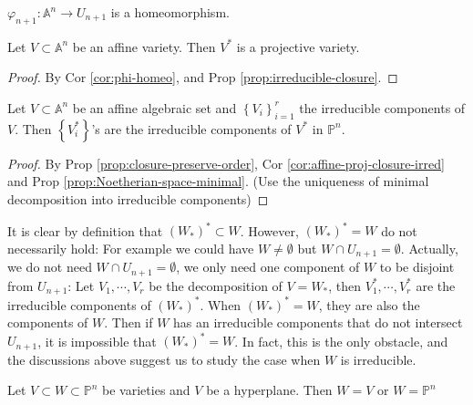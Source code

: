 \documentclass{note-eng}
\begin{document}
\begin{corollary}\label{cor:phi-homeo}
    $\varphi_{n + 1}: \mathbb{A}^n \rightarrow U_{n + 1}$ is a homeomorphism.
\end{corollary}

\begin{corollary}\label{cor:affine-proj-closure-irred}
    Let $V \subset \mathbb{A}^n$ be an affine variety. Then $V^\ast$ is a projective variety.
\end{corollary}

\begin{proof}
    By Cor \ref{cor:phi-homeo}, and Prop \ref{prop:irreducible-closure}.
\end{proof}

\begin{corollary}
    Let $V \subset \mathbb{A}^n$ be an affine algebraic set and $\left\lbrace V_i \right\rbrace_{i = 1}^r$ the irreducible components of $V$. Then $\left\lbrace V_i^\ast \right\rbrace$'s are the irreducible components of $V^\ast$ in $\mathbb{P}^n$.
\end{corollary}

\begin{proof}
    By Prop \ref{prop:closure-preserve-order}, Cor \ref{cor:affine-proj-closure-irred} and Prop \ref{prop:Noetherian-space-minimal}. (Use the uniqueness of minimal decomposition into irreducible components)
\end{proof}

It is clear by definition that $(W_\ast)^\ast \subset W$. However, $(W_\ast)^\ast = W$ do not necessarily hold: For example we could have $W \ne \emptyset$ but $W \cap U_{n + 1} = \emptyset$. Actually, we do not need $W \cap U_{n + 1} = \emptyset$, we only need one component of $W$ to be disjoint from $U_{n + 1}$: Let $V_1, \cdots, V_r$ be the decomposition of $V = W_\ast$, then $V_1^\ast, \cdots, V_r^\ast$ are the irreducible components of $(W_\ast)^\ast$. When $(W_\ast)^\ast = W$, they are also the components of $W$. Then if $W$ has an irreducible components that do not intersect $U_{n + 1}$, it is impossible that $(W_\ast)^\ast = W$. In fact, this is the only obstacle, and the discussions above suggest us to study the case when $W$ is irreducible.

\iffalse

\begin{lemma}
    Let $V \subset W \subset \mathbb{P}^n$ be varieties and $V$ be a hyperplane. Then $W = V$ or $W = \mathbb{P}^n$
\end{lemma}
\end{document}
